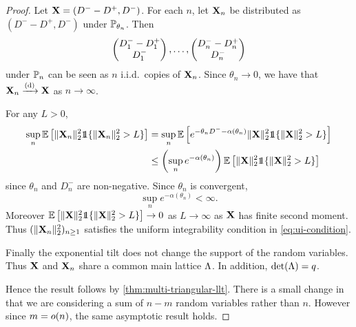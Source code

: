 \begin{proof}
    Let $\vX = (D^- - D^+, D^-)$. For each $n$, let $\vX_n$ be distributed as $(D^- - D^+, D^-)$ under $\P_{\theta_n}$. Then
    \begin{equation*}
        \vectwo{D_1^- - D_1^+}{D_1^-},
        \ldots,
        \vectwo{D_n^- - D_n^+}{D_n^-}
    \end{equation*}
    under $\P_n$ can be seen as $n$ i.i.d.\ copies of $\vX_n$. Since $\theta_n \to 0$, we have that $\vX_n \todist \vX$ as $n \to \infty$. 

    For any $L > 0$,
    \begin{align*}
        \sup_n \E \left[ 
            \norm{\vX_n}_2^2 \one\{\norm{\vX_n}_2^2 > L\}
        \right]
        &=
        \sup_n \E \left[ 
            e^{- \theta_n D^- - \alpha(\theta_n)}
            \norm{\vX}_2^2 \one\{\norm{\vX}_2^2 > L\}
        \right] \\
        &\leq
        \left(\sup_n e^{- \alpha(\theta_n)}\right) 
        \E \left[ 
            \norm{\vX}_2^2 \one\{\norm{\vX}_2^2 > L\}
        \right]
    \end{align*}
    since $\theta_n$ and $D^-_n$ are non-negative. Since $\theta_n$ is convergent,
    \begin{equation*}
        \sup_n e^{-\alpha(\theta_n)} < \infty.
    \end{equation*}
    Moreover $\E \left[ \norm{\vX}_2^2 \one\{\norm{\vX}_2^2 > L\} \right] \to 0$ as $L \to \infty$ as $\vX$ has finite second moment. Thus $(\norm{\vX_n}_2^2)_{n \geq 1}$ satisfies the uniform integrability condition in \cref{eq:ui-condition}.

    Finally the exponential tilt does not change the support of the random variables. Thus $\vX$ and $\vX_n$ share a common main lattice $\lattice$. In addition, $\det(\lattice) = q$.

    Hence the result follows by \cref{thm:multi-triangular-llt}. There is a small change in that we are considering a sum of $n - m$ random variables rather than $n$. However since $m = \littleo(n)$, the same asymptotic result holds.
\end{proof}

